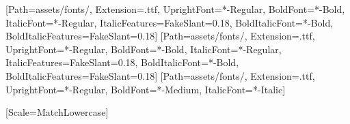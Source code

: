 

\setmainfont{ZenKakuGothicNew}[Path=assets/fonts/, Extension=.ttf,
  UprightFont=*-Regular, BoldFont=*-Bold,
  ItalicFont=*-Regular, ItalicFeatures={FakeSlant=0.18},
  BoldItalicFont=*-Bold, BoldItalicFeatures={FakeSlant=0.18}]
\setsansfont{ZenKakuGothicNew}[Path=assets/fonts/, Extension=.ttf,
  UprightFont=*-Regular, BoldFont=*-Bold,
  ItalicFont=*-Regular, ItalicFeatures={FakeSlant=0.18},
  BoldItalicFont=*-Bold, BoldItalicFeatures={FakeSlant=0.18}]
\setmonofont{IBMPlexMono}[Path=assets/fonts/, Extension=.ttf,
  UprightFont=*-Regular, BoldFont=*-Medium, ItalicFont=*-Italic]

\usepackage{newunicodechar}
\newfontfamily{}[Scale=MatchLowercase]





